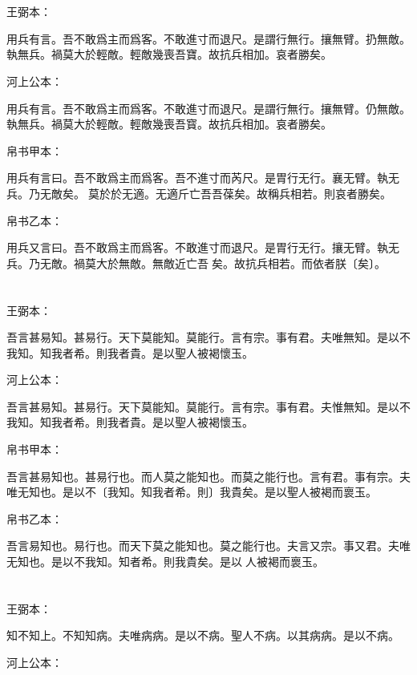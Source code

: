 \documentclass[a5paper]{ctexbook}
\begin{document}
    \chapter{}
    王弼本：

    用兵有言。吾不敢爲主而爲客。不敢進寸而退尺。是謂行無行。攘無臂。扔無敵。執無兵。禍莫大於輕敵。輕敵幾喪吾寶。故抗兵相加。哀者勝矣。

    河上公本：

    用兵有言。吾不敢爲主而爲客。不敢進寸而退尺。是謂行無行。攘無臂。仍無敵。執無兵。禍莫大於輕敵。輕敵幾喪吾寳。故抗兵相加。哀者勝矣。

    帛书甲本：

    用兵有言曰。吾不敢爲主而爲客。吾不進寸而芮尺。是胃行无行。襄无臂。執无兵。乃无敵矣。𢢸莫於於无適。无適斤亡吾吾葆矣。故稱兵相若。則哀者勝矣。

    帛书乙本：

    用兵又言曰。吾不敢爲主而爲客。不敢進寸而退尺。是胃行无行。攘无臂。執无兵。乃无敵。禍莫大於無敵。無敵近亡吾𤥯矣。故抗兵相若。而依者朕〔矣〕。

    \chapter{}
    王弼本：

    吾言甚易知。甚易行。天下莫能知。莫能行。言有宗。事有君。夫唯無知。是以不我知。知我者希。則我者貴。是以聖人被褐懷玉。

    河上公本：

    吾言甚易知。甚易行。天下莫能知。莫能行。言有宗。事有君。夫惟無知。是以不我知。知我者希。則我者貴。是以聖人被褐懷玉。

    帛书甲本：

    吾言甚易知也。甚易行也。而人莫之能知也。而莫之能行也。言有君。事有宗。夫唯无知也。是以不〔我知。知我者希。則〕我貴矣。是以聖人被褐而褱玉。

    帛书乙本：

    吾言易知也。易行也。而天下莫之能知也。莫之能行也。夫言又宗。事又君。夫唯无知也。是以不我知。知者希。則我貴矣。是以𦔻人被褐而褱玉。

    \chapter{}
    王弼本：

    知不知上。不知知病。夫唯病病。是以不病。聖人不病。以其病病。是以不病。

    河上公本：
\end{document}
